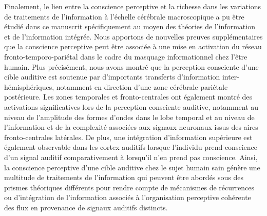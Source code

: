 Finalement, le lien entre la conscience perceptive et la richesse dans les variations de traitements de l'information à l'échelle cérébrale macroscopique a pu être étudié dans ce manuscrit spécifiquement au moyen des théories de l'information et de l'information intégrée. 
Nous apportons de nouvelles preuves supplémentaires que la conscience perceptive peut être associée à une mise en activation du réseau fronto-temporo-pariétal dans le cadre du masquage informationnel chez l'être humain. 
Plus précisément, nous avons montré que la perception consciente d'une cible auditive est soutenue par d'importants transferts d'information inter-hémisphériques, notamment en direction d'une zone cérébrale pariétale postérieure. 
Les zones temporales et fronto-centrales ont également montré des activations significatives lors de la perception consciente auditive, notamment au niveau de l'amplitude des formes d'ondes dans le lobe temporal et au niveau de l'information et de la complexité associées aux signaux neuronaux issus des aires fronto-centrales latérales. 
De plus, une intégration d'information supérieure est également observable dans les cortex auditifs lorsque l'individu prend conscience d'un signal auditif comparativement à lorsqu'il n'en prend pas conscience. 
Ainsi, la conscience perceptive d'une cible auditive chez le sujet humain sain génère une multitude de traitements de l'information qui peuvent être abordés sous des prismes théoriques différents pour rendre compte de mécanismes de récurrences ou d'intégration de l'information associés à l'organisation perceptive cohérente des flux en provenance de signaux auditifs distincts. 

\clearpage\null\newpage
